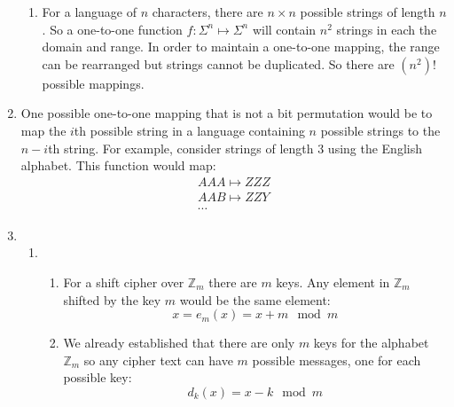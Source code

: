 \documentclass{amsart}
\begin{document}
\begin{enumerate}
\begin{enumerate}
\item For a language of $n$ characters, there are $n\times n$ possible strings of length $n$.  So a one-to-one function $f:\Sigma^n\mapsto\Sigma^n$ will contain $n^2$ strings in each the domain and range.  In order to maintain a one-to-one mapping, the range can be rearranged but strings cannot be duplicated.  So there are $(n^2)!$ possible mappings.
\end{enumerate}

\item One possible one-to-one mapping that is not a bit permutation would be to map the $i$th possible string in a language containing $n$ possible strings to the $n-i$th string.  For example, consider strings of length 3 using the English alphabet.  This function would map:
\begin{gather*}
AAA\mapsto ZZZ\\
AAB\mapsto ZZY\\
\cdots
\end{gather*}

\item
\begin{enumerate}
\item
\begin{enumerate}
\item For a shift cipher over $\mathbb{Z}_m$ there are $m$ keys.  Any element in $\mathbb{Z}_m$ shifted by the key $m$ would be the same element:
\begin{displaymath}
x = e_m(x)=x+m\mod m
\end{displaymath}

\item We already established that there are only $m$ keys for the alphabet $\mathbb{Z}_m$ so any cipher text can have $m$ possible messages, one for each possible key:
\begin{displaymath}
d_k(x) = x - k\mod m
\end{displaymath}
\end{enumerate}


\end{enumerate}
\end{enumerate}
\end{document}
